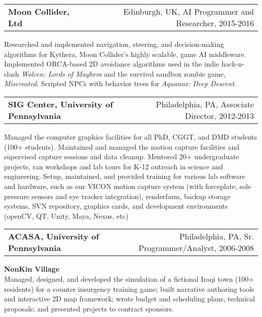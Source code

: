 \medskip
\medskip

\needspace{6em}
\begin{tabular*}{7.1in}{@{}l@{\extracolsep\fill}r}
{\large {\bf Moon Collider, Ltd}} & Edinburgh, UK, AI Programmer and Researcher, 2015-2016\\
\end{tabular*}

Researched and implemented navigation, steering, and decision-making algorithms
for Kythera, Moon Collider's highly scalable, game AI middleware. Implemented
ORCA-based 2D avoidance algorithms used in the indie hack-n-slash \emph{Wolcen:
Lords of Mayhem} and the survival sandbox zombie game, \emph{Miscreated}.
Scripted NPCs with behavior trees for \emph{Aquanox: Deep Descent}.

\medskip
\medskip

\needspace{6em}
\begin{tabular*}{7.1in}{@{}l@{\extracolsep\fill}r}
{\large {\bf SIG Center, University of Pennsylvania}} & Philadelphia, PA, Associate Director, 2012-2013\\
\end{tabular*}

Managed the computer graphics facilities for all PhD, CGGT, and DMD students
(100+ students). Maintained and managed the motion capture facilities and
supervised capture sessions and data cleanup. Mentored 20+ undergraduate
projects, ran workshops and lab tours for K-12 outreach in science and
engineering. Setup, maintained, and provided training for various lab software
and hardware, such as our VICON motion capture system (with forceplate, sole
pressure sensors and eye tracker integration), renderfarm, backup storage
systems, SVN repository, graphics cards, and development environments (openCV,
QT, Unity, Maya, Nexus, etc)

\medskip

\needspace{6em}
\begin{tabular*}{7.1in}{@{}l@{\extracolsep\fill}r}
{\large {\bf ACASA, University of Pennsylvania}} & Philadelphia, PA, Sr. Programmer/Analyst, 2006-2008\\
\end{tabular*}

{\bf NonKin Village}\\
Managed, designed, and developed the simulation of a fictional Iraqi town (100+ residents) for a counter insurgency training game; built narrative authoring tools and interactive 2D map framework; wrote budget and scheduling plans, technical proposals; and presented projects to contract sponsors.

